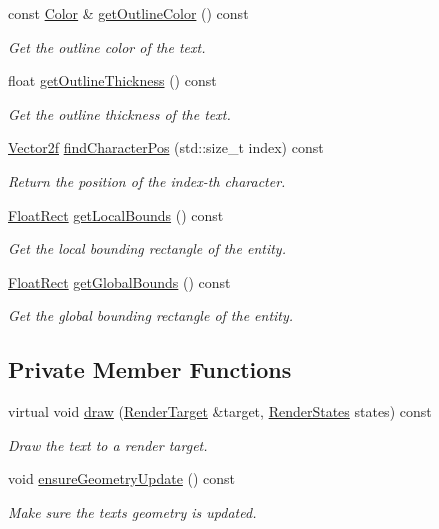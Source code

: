 \begin{DoxyCompactItemize}
const \mbox{\hyperlink{classsf_1_1_color}{Color}} \& \mbox{\hyperlink{classsf_1_1_text_a53559d563461089f1172571b375442dc}{get\+Outline\+Color}} () const
\begin{DoxyCompactList}\small\item\em Get the outline color of the text. \end{DoxyCompactList}\item 
float \mbox{\hyperlink{classsf_1_1_text_af6bf01c23189edf52c8b38708db6f3f6}{get\+Outline\+Thickness}} () const
\begin{DoxyCompactList}\small\item\em Get the outline thickness of the text. \end{DoxyCompactList}\item 
\mbox{\hyperlink{classsf_1_1_vector2}{Vector2f}} \mbox{\hyperlink{classsf_1_1_text_a2e252d8dcae3eb61c6c962c0bc674b12}{find\+Character\+Pos}} (std\+::size\+\_\+t index) const
\begin{DoxyCompactList}\small\item\em Return the position of the {\itshape index-\/th} character. \end{DoxyCompactList}\item 
\mbox{\hyperlink{classsf_1_1_rect}{Float\+Rect}} \mbox{\hyperlink{classsf_1_1_text_a3e6b3b298827f853b41165eee2cbbc66}{get\+Local\+Bounds}} () const
\begin{DoxyCompactList}\small\item\em Get the local bounding rectangle of the entity. \end{DoxyCompactList}\item 
\mbox{\hyperlink{classsf_1_1_rect}{Float\+Rect}} \mbox{\hyperlink{classsf_1_1_text_ad33ed96ce9fbe99610f7f8b6874a16b4}{get\+Global\+Bounds}} () const
\begin{DoxyCompactList}\small\item\em Get the global bounding rectangle of the entity. \end{DoxyCompactList}\end{DoxyCompactItemize}
\subsection*{Private Member Functions}
\begin{DoxyCompactItemize}
\item 
virtual void \mbox{\hyperlink{classsf_1_1_text_a42f0cd394f76f4c0998114918cb3f11c}{draw}} (\mbox{\hyperlink{classsf_1_1_render_target}{Render\+Target}} \&target, \mbox{\hyperlink{classsf_1_1_render_states}{Render\+States}} states) const
\begin{DoxyCompactList}\small\item\em Draw the text to a render target. \end{DoxyCompactList}\item 
void \mbox{\hyperlink{classsf_1_1_text_a4cd48624a76df98f048eaaee69cfb0ad}{ensure\+Geometry\+Update}} () const
\begin{DoxyCompactList}\small\item\em Make sure the text\textquotesingle{}s geometry is updated. \end{DoxyCompactList}\end{DoxyCompactItemize}
